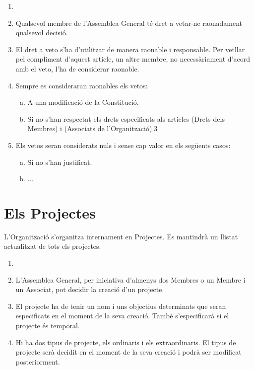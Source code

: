 \documentclass[12pt]{article}
\begin{document}
\begin{art}
    \begin{enumerate}[1.]
        \item[]
        \item Qualsevol membre de l'Assemblea General té dret a vetar-ne raonadament qualsevol decisió.
        \item El dret a veto s'ha d'utilitzar de manera raonable i responsable. Per vetllar pel compliment d'aquest article, un altre membre, no necessàriament d'acord amb el veto, l'ha de considerar raonable.
        \item Sempre es consideraran raonables els vetos:
            \begin{enumerate}[a)]
                \item A una modificació de la Constitució.
                \item Si no s'han respectat els drets especificats als articles (Drets dels Membres) i (Associats de l'Organització).3 %
            \end{enumerate}
        \item Els vetos seran considerats nuls i sense cap valor en els següents casos:
            \begin{enumerate}[a)]
                \item Si no s'han justificat.
                \item ... %
            \end{enumerate}
    \end{enumerate}
\end{art}


\section{Els Projectes}

\begin{art}
    L'Organització s'organitza internament en Projectes. Es mantindrà un llistat actualitzat de tots els projectes.
\end{art}


\begin{art}
    \begin{enumerate}[1.]
        \item[]
        \item L'Assemblea General, per iniciativa d'almenys dos Membres o un Membre i un Associat, pot decidir la creació d'un projecte.
        \item El projecte ha de tenir un nom i uns objectius determinats que seran especificats en el moment de la seva creació. També s'especificarà si el projecte és temporal.
        \item Hi ha dos tipus de projecte, els ordinaris i els extraordinaris. El tipus de projecte serà decidit en el moment de la seva creació i podrà ser modificat posteriorment.
    \end{enumerate}
\end{art}
\end{document}
